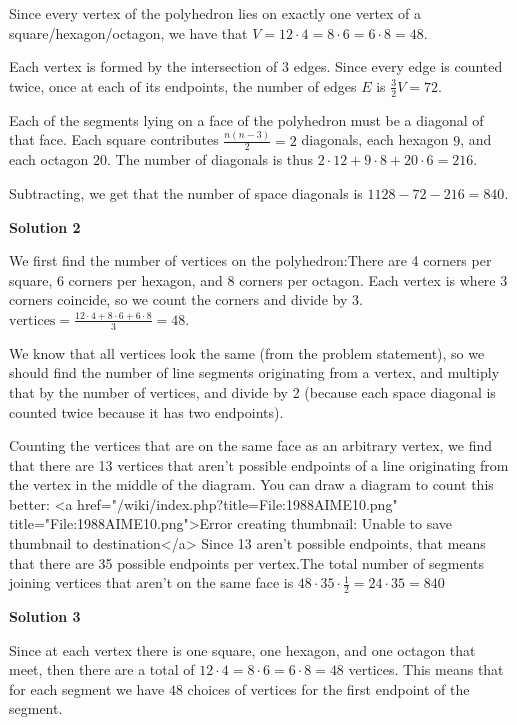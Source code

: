 \begin{enumerate}
 Since every vertex of the polyhedron lies on exactly one vertex of a square/hexagon/octagon, we have that $V = 12 \cdot 4 = 8 \cdot 6 = 6 \cdot 8 = 48$.

 Each vertex is formed by the intersection of 3 edges. Since every edge is counted twice, once at each of its endpoints, the number of edges $E$ is $\frac{3}{2}V = 72$.

 Each of the segments lying on a face of the polyhedron must be a diagonal of that face. Each square contributes $\frac{n(n-3)}{2} = 2$ diagonals, each hexagon $9$, and each octagon $20$. The number of diagonals is thus $2 \cdot 12 + 9 \cdot 8 + 20 \cdot 6 = 216$.

 Subtracting, we get that the number of space diagonals is $1128 - 72 - 216 = \boxed{840}$.

 



\textbf{Solution 2}

We first find the number of vertices on the polyhedron:There are 4 corners per square, 6 corners per hexagon, and 8 corners per octagon. Each vertex is where 3 corners coincide, so we count the corners and divide by 3.  $\text{vertices} = \frac{12 \cdot 4 + 8 \cdot 6 + 6 \cdot 8}{3}=48$.

 We know that all vertices look the same (from the problem statement), so we should find the number of line segments originating from a vertex, and multiply that by the number of vertices, and divide by 2 (because each space diagonal is counted twice because it has two endpoints).

 Counting the vertices that are on the same face as an arbitrary vertex, we find that there are 13 vertices that aren't possible endpoints of a line originating from the vertex in the middle of the diagram. You can draw a diagram to count this better: <a href="/wiki/index.php?title=File:1988AIME10.png" title="File:1988AIME10.png">Error creating thumbnail: Unable to save thumbnail to destination</a> Since 13 aren't possible endpoints, that means that there are 35 possible endpoints per vertex.The total number of segments joining vertices that aren't on the same face is $48\cdot 35\cdot \frac 12 = 24 \cdot 35 = \boxed{840}$




\textbf{Solution 3}

Since at each vertex there is one square, one hexagon, and one octagon that meet, then there are a total of $12 \cdot 4 = 8 \cdot 6 = 6 \cdot 8 = 48$ vertices. This means that for each segment we have $48$ choices of vertices for the first endpoint of the segment.


\end{enumerate}
